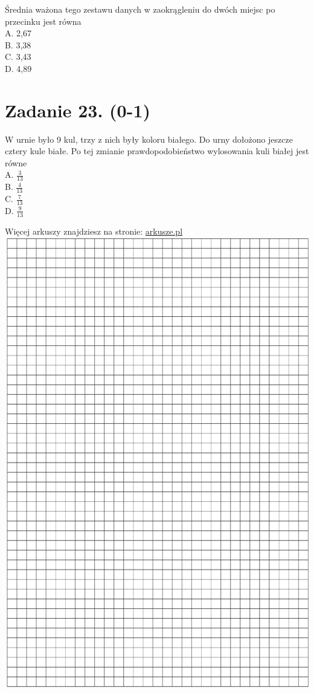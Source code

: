 \documentclass[10pt]{article}
\begin{document}
Średnia ważona tego zestawu danych w zaokrągleniu do dwóch miejsc po przecinku jest równa\\
A. 2,67\\
B. 3,38\\
C. 3,43\\
D. 4,89

\section*{Zadanie 23. (0-1)}
W urnie było 9 kul, trzy z nich były koloru białego. Do urny dołożono jeszcze cztery kule białe. Po tej zmianie prawdopodobieństwo wylosowania kuli białej jest równe\\
A. \(\frac{3}{13}\)\\
B. \(\frac{4}{13}\)\\
C. \(\frac{7}{13}\)\\
D. \(\frac{9}{13}\)

Więcej arkuszy znajdziesz na stronie: \href{http://arkusze.pl}{arkusze.pl}\\
\includegraphics[max width=\textwidth, center]{2024_11_21_dd21f7544b65bcf1b3c7g-09}
\end{document}
